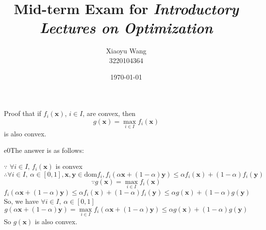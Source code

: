 \documentclass{article}
\title{Mid-term Exam for \emph{Introductory Lectures on Optimization}}
\author{Xiaoyu Wang \\ 3220104364}
\date{\today}
\newcommand{\xB}{\bm{x}}
\newcommand{\yB}{\bm{y}}
\begin{document}
\maketitle

\begin{excercise}\label{e0}
Proof that if $f_i(\xB)$, $i \in I$, are convex, then
\[
g(\xB) = \max_{i \in I} f_i(\xB)
\]
is also convex.
\end{excercise}
\begin{PROOF}{e0}The answer is as follows:

	$\because$ $\forall i \in I$, $f_i(\xB)$ is convex
	\[
		\therefore \forall i\in I,\ \alpha \in [0,1],\xB ,\yB \in \text{dom} f_i ,f_i(\alpha\xB+(1-\alpha)\yB)\le \alpha f_i(\xB)+(1-\alpha)f_i(\yB)
	\]
	\[
		\because g(\xB) = \max_{i \in I} f_i(\xB)
	\]
	\[
		f_i(\alpha\xB+(1-\alpha)\yB)\le \alpha f_i(\xB)+(1-\alpha)f_i(\yB)\le \alpha g(\xB)+(1-\alpha)g(\yB)
	\]
	So, we have $\forall i\in I,\ \alpha \in [0,1] $ 
	\[
		g(\alpha \xB+(1-\alpha)\yB)= \max_{i\in I} f_i(\alpha\xB+(1-\alpha)\yB)  \le \alpha g(\xB)+(1-\alpha)g(\yB)
	\]
	So $g(\xB)$ is also convex.

\end{PROOF}
\end{document}
